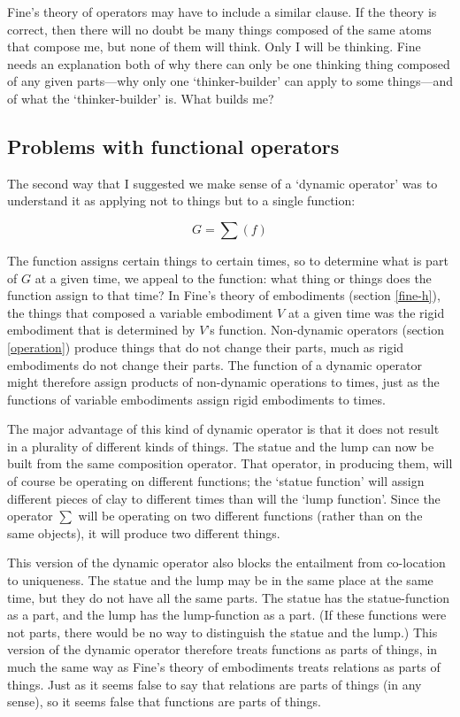 \documentclass[11pt]{article}
\begin{document}
\begin{spacing}{1.5}
Fine's theory of operators may have to include a similar clause.  If
the theory is correct, then there will no doubt be many things
composed of the same atoms that compose me, but none of them will
think.  Only I will be thinking.  Fine needs an explanation both of
why there can only be one thinking thing composed of any given
parts---why only one `thinker-builder' can apply to some things---and
of what the `thinker-builder' is.  What builds me?

\subsection{Problems with functional operators}
\label{problems2b}
The second way that I suggested we make sense of a `dynamic operator'
was to understand it as applying not to things but to a single
function:

\begin{displaymath}
G = \sum ( f )
\end{displaymath}

The function assigns certain things to certain times, so to determine
what is part of $G$ at a given time, we appeal to the function: what
thing or things does the function assign to that time?  In Fine's
theory of embodiments (section \ref{fine-h}), the things that composed
a variable embodiment $V$ at a given time was the rigid embodiment
that is determined by $V$'s function.  Non-dynamic operators (section
\ref{operation}) produce things that do not change their parts, much
as rigid embodiments do not change their parts.  The function of a
dynamic operator might therefore assign products of non-dynamic
operations to times, just as the functions of variable embodiments
assign rigid embodiments to times.

The major advantage of this kind of dynamic operator is that it does
not result in a plurality of different kinds of things.  The statue
and the lump can now be built from the same composition operator.
That operator, in producing them, will of course be operating on
different functions; the `statue function' will assign different
pieces of clay to different times than will the `lump function'.
Since the operator $\sum$ will be operating on two different functions
(rather than on the same objects), it will produce two different
things.

This version of the dynamic operator also blocks the entailment from
co-location to uniqueness.  The statue and the lump may be in the same
place at the same time, but they do not have all the same parts.  The
statue has the statue-function as a part, and the lump has the
lump-function as a part.  (If these functions were not parts, there
would be no way to distinguish the statue and the lump.)  This version
of the dynamic operator therefore treats functions as parts of things,
in much the same way as Fine's theory of embodiments treats relations
as parts of things.  Just as it seems false to say that relations are
parts of things (in any sense), so it seems false that functions are
parts of things.


\end{spacing}
\end{document}
